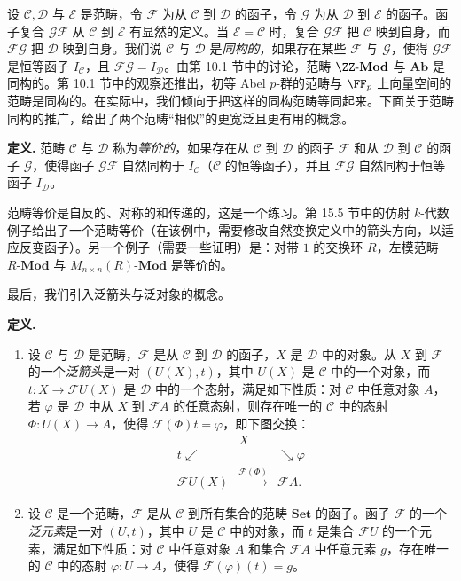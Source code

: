 设 $\mathcal C,\mathcal D$ 与 $\mathcal E$ 是范畴，令 $\mathcal F$ 为从 $\mathcal C$ 到 $\mathcal D$ 的函子，令 $\mathcal G$ 为从 $\mathcal D$ 到 $\mathcal E$ 的函子。函子复合 $\mathcal G\mathcal F$ 从 $\mathcal C$ 到 $\mathcal E$ 有显然的定义。当 $\mathcal E=\mathcal C$ 时，复合 $\mathcal G\mathcal F$ 把 $\mathcal C$ 映到自身，而 $\mathcal F\mathcal G$ 把 $\mathcal D$ 映到自身。我们说 $\mathcal C$ 与 $\mathcal D$ 是\emph{同构的}，如果存在某些 $\mathcal F$ 与 $\mathcal G$，使得 $\mathcal G\mathcal F$ 是恒等函子 $I_{\mathcal C}$，且 $\mathcal F\mathcal G=I_{\mathcal D}$。由第 10.1 节中的讨论，范畴 $\ZZ\text{-}\mathbf{Mod}$ 与 $\mathbf{Ab}$ 是同构的。第 10.1 节中的观察还推出，初等 Abel $p$-群的范畴与 $\FF_p$ 上向量空间的范畴是同构的。在实际中，我们倾向于把这样的同构范畴等同起来。下面关于范畴同构的推广，给出了两个范畴“相似”的更宽泛且更有用的概念。

\noindent\textbf{定义.} 范畴 $\mathcal C$ 与 $\mathcal D$ 称为\emph{等价的}，如果存在从 $\mathcal C$ 到 $\mathcal D$ 的函子 $\mathcal F$ 和从 $\mathcal D$ 到 $\mathcal C$ 的函子 $\mathcal G$，使得函子 $\mathcal G\mathcal F$ 自然同构于 $I_{\mathcal C}$（$\mathcal C$ 的恒等函子），并且 $\mathcal F\mathcal G$ 自然同构于恒等函子 $I_{\mathcal D}$。

范畴等价是自反的、对称的和传递的，这是一个练习。第 15.5 节中的仿射 $k$-代数例子给出了一个范畴等价（在该例中，需要修改自然变换定义中的箭头方向，以适应反变函子）。另一个例子（需要一些证明）是：对带 $1$ 的交换环 $R$，左模范畴 $R\text{-}\mathbf{Mod}$ 与 $M_{n\times n}(R)\text{-}\mathbf{Mod}$ 是等价的。

最后，我们引入泛箭头与泛对象的概念。

\noindent\textbf{定义.}
\begin{enumerate}[label=(\arabic*)]
  \item 设 $\mathcal C$ 与 $\mathcal D$ 是范畴，$\mathcal F$ 是从 $\mathcal C$ 到 $\mathcal D$ 的函子，$X$ 是 $\mathcal D$ 中的对象。从 $X$ 到 $\mathcal F$ 的一个\emph{泛箭头}是一对 $(U(X),t)$，其中 $U(X)$ 是 $\mathcal C$ 中的一个对象，而 $t:X\to\mathcal F U(X)$ 是 $\mathcal D$ 中的一个态射，满足如下性质：对 $\mathcal C$ 中任意对象 $A$，若 $\varphi$ 是 $\mathcal D$ 中从 $X$ 到 $\mathcal F A$ 的任意态射，则存在唯一的 $\mathcal C$ 中的态射 $\Phi:U(X)\to A$，使得 $\mathcal F(\Phi)t=\varphi$，即下图交换：
  \[
  \begin{array}{ccc}
     & X & \\
     t\swarrow && \searrow\varphi\\
     \mathcal F U(X) & \xrightarrow{\mathcal F(\Phi)} & \mathcal F A.
  \end{array}
  \]

  \item 设 $\mathcal C$ 是一个范畴，$\mathcal F$ 是从 $\mathcal C$ 到所有集合的范畴 $\mathbf{Set}$ 的函子。函子 $\mathcal F$ 的一个\emph{泛元素}是一对 $(U,t)$，其中 $U$ 是 $\mathcal C$ 中的对象，而 $t$ 是集合 $\mathcal F U$ 的一个元素，满足如下性质：对 $\mathcal C$ 中任意对象 $A$ 和集合 $\mathcal F A$ 中任意元素 $g$，存在唯一的 $\mathcal C$ 中的态射 $\varphi:U\to A$，使得 $\mathcal F(\varphi)(t)=g$。
\end{enumerate}

